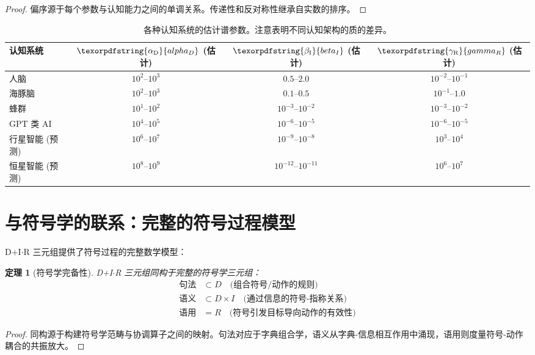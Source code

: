 \documentclass[11pt,a4paper]{article}
\newtheorem{theorem}{定理}
\DeclareRobustCommand{\alD}{\texorpdfstring{\ensuremath{\alpha_{\mathrm{D}}}}{alpha_D}}
\DeclareRobustCommand{\beI}{\texorpdfstring{\ensuremath{\beta_{\mathrm{I}}}}{beta_I}}
\DeclareRobustCommand{\gaR}{\texorpdfstring{\ensuremath{\gamma_{\mathrm{R}}}}{gamma_R}}
\begin{document}
	\begin{proof}
		偏序源于每个参数与认知能力之间的单调关系。传递性和反对称性继承自实数的排序。
	\end{proof}
	
	\begin{table}[ht]
		\centering
		\begin{tabular}{lccc}
			\toprule
			\textbf{认知系统} & \(\alD\) (估计) & \(\beI\) (估计) & \(\gaR\) (估计) \\
			\midrule
			人脑 & \(10^2\)--\(10^3\) & \(0.5\)--\(2.0\) & \(10^{-2}\)--\(10^{-1}\) \\
			海豚脑 & \(10^2\)--\(10^3\) & \(0.1\)--\(0.5\) & \(10^{-1}\)--\(1.0\) \\
			蜂群 & \(10^1\)--\(10^2\) & \(10^{-3}\)--\(10^{-2}\) & \(10^{-3}\)--\(10^{-2}\) \\
			GPT 类 AI & \(10^4\)--\(10^5\) & \(10^{-6}\)--\(10^{-5}\) & \(10^{-6}\)--\(10^{-5}\) \\
			行星智能 (预测) & \(10^6\)--\(10^7\) & \(10^{-9}\)--\(10^{-8}\) & \(10^3\)--\(10^4\) \\
			恒星智能 (预测) & \(10^8\)--\(10^9\) & \(10^{-12}\)--\(10^{-11}\) & \(10^6\)--\(10^7\) \\
			\bottomrule
		\end{tabular}
		\caption{各种认知系统的估计谱参数。注意表明不同认知架构的质的差异。}
		\label{tab:cognitive-params}
	\end{table}
	
	\section{与符号学的联系：完整的符号过程模型}
	
	D+I\(\cdot\)R 三元组提供了符号过程的完整数学模型：
	
	\begin{theorem}[符号学完备性]
		D+I\(\cdot\)R 三元组同构于完整的符号学三元组：
		\begin{align*}
			\text{句法} &\subset D \quad \text{(组合符号/动作的规则)} \\
			\text{语义} &\subset D \times I \quad \text{(通过信息的符号-指称关系)} \\
			\text{语用} &= R \quad \text{(符号引发目标导向动作的有效性)}
		\end{align*}
	\end{theorem}
	
	\begin{proof}
		同构源于构建符号学范畴与协调算子之间的映射。句法对应于字典组合学，语义从字典-信息相互作用中涌现，语用则度量符号-动作耦合的共振放大。
	\end{proof}
	
\end{document}
